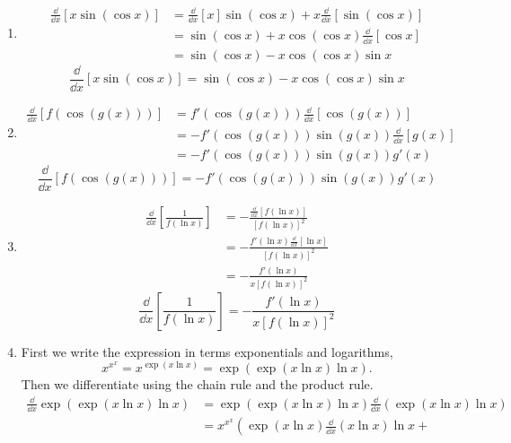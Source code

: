 \begin{Solution}
  \label{solution d/dx x sin cos x}
  \renewcommand{\theenumi}{\alph{enumi}}
  \begin{enumerate}
  \item
    \begin{align*}
      \frac{\dd}{\dd x} [x \sin( \cos x) ]
      &= \frac{\dd}{\dd x} [x] \sin( \cos x ) + x \frac{\dd}{\dd x} [\sin(\cos x)]\\
      &= \sin( \cos x ) + x \cos(\cos x) \frac{\dd}{\dd x} [\cos x] \\
      &= \sin( \cos x ) - x \cos(\cos x) \sin x
    \end{align*}
    \[
    \boxed{
      \frac{\dd}{\dd x} [x \sin( \cos x) ] = \sin( \cos x ) - x \cos(\cos x) \sin x
      }
    \]
  \item
    \begin{align*}
      \frac{\dd}{\dd x} [f(\cos(g(x)))]
      &= f'(\cos(g(x))) \frac{\dd}{\dd x} [\cos(g(x))] \\
      &= - f'(\cos(g(x))) \sin(g(x)) \frac{\dd}{\dd x} [g(x)] \\
      &= - f'(\cos(g(x))) \sin(g(x)) g'(x)
    \end{align*}
    \[
    \boxed{
      \frac{\dd}{\dd x} [f(\cos(g(x)))] = - f'(\cos(g(x))) \sin(g(x)) g'(x)
      }
    \]
  \item
    \begin{align*}
      \frac{\dd}{\dd x} \left[ \frac{1}{f(\ln x)} \right]
      &= - \frac{ \frac{\dd}{\dd x} [ f(\ln x) ] }{ [f(\ln x) ]^2 } \\
      &= - \frac{ f'(\ln x) \frac{\dd}{\dd x} [\ln x] }{ [f(\ln x) ]^2 } \\
      &= - \frac{ f'(\ln x) }{ x [f(\ln x) ]^2 }
    \end{align*}
    \[
    \boxed{
      \frac{\dd}{\dd x} \left[ \frac{1}{f(\ln x)} \right]
      = - \frac{ f'(\ln x) }{ x [f(\ln x) ]^2 }
      }
    \]
  \item
    First we write the expression in terms exponentials and logarithms,
    \[
    x^{x^x} = x^{\exp( x \ln x)} = \exp( \exp( x \ln x ) \ln x ).
    \]
    Then we differentiate using the chain rule and the product rule.
    \begin{align*}
      \frac{\dd}{\dd x} \exp( \exp( x \ln x ) \ln x )
      &= \exp( \exp( x \ln x ) \ln x )
      \frac{\dd}{\dd x} (\exp( x \ln x ) \ln x ) \\
      &= x^{x^x} \left(
        \exp( x \ln x ) \frac{\dd}{\dd x} (x \ln x ) \ln x  +

\end{align*}
\end{enumerate}
\end{Solution}
